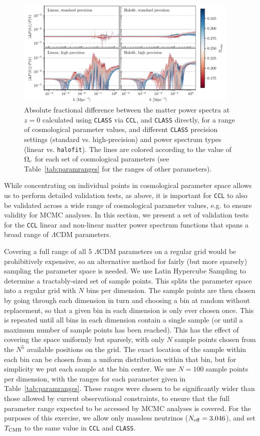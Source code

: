 \documentclass[\docopts]{\docclass}
\newcommand{\ccl}{{\tt CCL}\xspace}
\newcommand{\halofit}{{\tt halofit}\xspace}
\newcommand{\class}{{\tt CLASS}\xspace}
\begin{document}
\begin{figure}
\centering
\includegraphics[width=0.95\textwidth]{pkdev_v2_z0_00}
\caption{Absolute fractional difference between the matter power spectra at $z=0$ calculated using \class via \ccl, and \class directly, for a range of cosmological parameter values, and different \class precision settings (standard vs. high-precision) and power spectrum types (linear vs. \halofit). The lines are colored according to the value of $\Omega_{\rm c}$ for each set of cosmological parameters (see Table~\ref{tab:paramranges} for the ranges of other parameters).}
\label{fig:power_paramspace}
\end{figure}

While concentrating on individual points in cosmological parameter space allows us to perform detailed validation tests, as above, it is important for \ccl to also be validated across a wide range of cosmological parameter values, e.g. to ensure validity for MCMC analyses. In this section, we present a set of validation tests for the \ccl linear and non-linear matter power spectrum functions that spans a broad range of $\Lambda$CDM parameters.

Covering a full range of all 5 $\Lambda$CDM parameters on a regular grid would be prohibitively expensive, so an alternative method for fairly (but more sparsely) sampling the parameter space is needed. We use Latin Hypercube Sampling to determine a tractably-sized set of sample points. This splits the parameter space into a regular grid with $N$ bins per dimension. The sample points are then chosen by going through each dimension in turn and choosing a bin at random without replacement, so that a given bin in each dimension is only ever chosen once. This is repeated until all bins in each dimension contain a single sample (or until a maximum number of sample points has been reached). This has the effect of covering the space uniformly but sparsely, with only $N$ sample points chosen from the $N^5$ available positions on the grid. The exact location of the sample within each bin can be chosen from a uniform distribution within that bin, but for simplicity we put each sample at the bin center. We use $N=100$ sample points per dimension, with the ranges for each parameter given in Table~\ref{tab:paramranges}. These ranges were chosen to be significantly wider than those allowed by current observational constraints, to ensure that the full parameter range expected to be accessed by MCMC analyses is covered. For the purposes of this exercise, we allow only massless neutrinos ($N_{\rm eff} = 3.046$), and set $T_{\rm CMB}$ to the same value in \ccl and \class.
%

\end{document}
